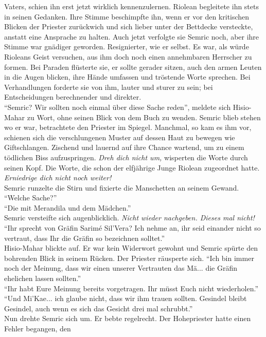 Vaters, schien ihn erst jetzt wirklich kennenzulernen. Riolean begleitete ihn stets in seinen 
Gedanken. Ihre Stimme beschimpfte ihn, wenn er vor den kritischen Blicken der Priester zurückwich 
und sich lieber unter der Bettdecke versteckte, anstatt eine Ansprache zu halten. Auch jetzt 
verfolgte sie Semric noch, aber ihre Stimme war gnädiger geworden. Resignierter, wie er selbst. Es 
war, als würde Rioleans Geist versuchen, aus ihm doch noch einen annehmbaren Herrscher zu formen. 
Bei Paraden flüsterte sie, er sollte gerader sitzen, auch den armen Leuten in die Augen blicken, 
ihre Hände umfassen und tröstende Worte sprechen. Bei Verhandlungen forderte sie von ihm, lauter und 
sturer zu sein; bei Entscheidungen berechnender und direkter.\\
``Semric? Wir sollten noch einmal über diese Sache reden'', meldete sich Hisio-Mahar zu Wort, ohne 
seinen Blick von dem Buch zu wenden. Semric blieb stehen wo er war, betrachtete den Priester im 
Spiegel. Manchmal, so kam es ihm vor, schienen sich die verschlungenen Muster auf dessen Haut zu 
bewegen wie Giftschlangen. Zischend und lauernd auf ihre Chance wartend, um zu einem tödlichen Biss 
aufzuspringen. \textit{Dreh dich nicht um,} wisperten die Worte durch seinen Kopf. Die Worte, die 
schon der elfjährige Junge Riolean zugeordnet hatte. \textit{Erniedrige dich nicht noch weiter!}\\
Semric runzelte die Stirn und fixierte die Manschetten an seinem Gewand. ``Welche Sache?''\\
``Die mit Merandila und dem Mädchen.''\\
Semric versteifte sich augenblicklich. \textit{Nicht wieder nachgeben. Dieses mal nicht!}\\
``Ihr sprecht von Gräfin Sarimé Sil'Vera? Ich nehme an, ihr seid einander nicht so vertraut, dass 
Ihr die Gräfin so bezeichnen solltet.''\\
Hisio-Mahar blickte auf. Er war kein Widerwort gewohnt und Semric spürte den bohrenden Blick in 
seinem Rücken. Der Priester räusperte sich. ``Ich bin immer noch der Meinung, dass wir einen 
unserer Vertrauten das Mä... die Gräfin ehelichen lassen sollten.''\\
``Ihr habt Eure Meinung bereits vorgetragen. Ihr müsst Euch nicht wiederholen.''\\
``Und Mi'Kae... ich glaube nicht, dass wir ihm trauen sollten. Gesindel bleibt Gesindel, auch wenn 
es sich das Gesicht drei mal schrubbt.''\\
Nun drehte Semric sich um. Er bebte regelrecht. Der Hohepriester hatte einen Fehler begangen, den  
